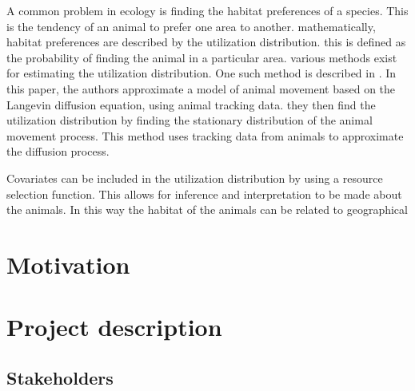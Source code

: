

A common problem in ecology is finding the habitat preferences of a species. This is the tendency of an animal to prefer one area to another. mathematically, habitat preferences are described by the utilization distribution. this is defined as the probability of finding the animal in a particular area. various methods exist for estimating the utilization distribution. One such method is described in \cite{michelot_langevin_2019}. In this paper, the authors approximate a model of animal movement based on the Langevin diffusion equation, using animal tracking data. they then find the utilization distribution by finding the stationary distribution of the animal movement process. This method uses tracking data from animals to approximate the diffusion process. 

Covariates can be included in the utilization distribution by using a resource selection function. This allows for inference and interpretation to be made about the animals. In this way the habitat of the animals can be related to geographical 

\section{Motivation}



\section{Project description}



\subsection{Stakeholders}

